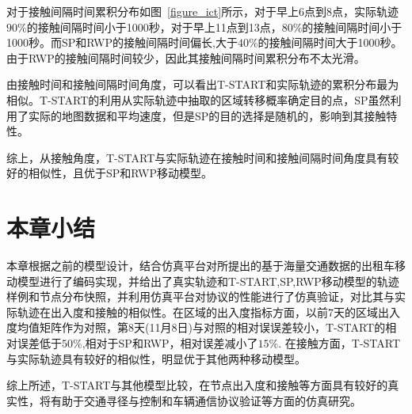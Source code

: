 对于接触间隔时间累积分布如图~\ref{figure_ict}所示，对于早上6点到8点，实际轨迹$90\%$的接触间隔时间小于1000秒，对于早上11点到13点，$80\%$的接触间隔时间小于1000秒。而SP和RWP的接触间隔时间偏长,大于$40\%$的接触间隔时间大于1000秒。由于RWP的接触间隔时间较少，因此其接触间隔时间累积分布不太光滑。

由接触时间和接触间隔时间角度，可以看出T-START和实际轨迹的累积分布最为相似。T-START的利用从实际轨迹中抽取的区域转移概率确定目的点，SP虽然利用了实际的地图数据和平均速度，但是SP的目的选择是随机的，影响到其接触特性。

综上，从接触角度，T-START与实际轨迹在接触时间和接触间隔时间角度具有较好的相似性，且优于SP和RWP移动模型。
\section{本章小结}

本章根据之前的模型设计，结合仿真平台对所提出的基于海量交通数据的出租车移动模型进行了编码实现，并给出了真实轨迹和T-START,SP,RWP移动模型的轨迹样例和节点分布快照，并利用仿真平台对协议的性能进行了仿真验证，对比其与实际轨迹在出入度和接触的相似性。在区域的出入度指标方面，以前7天的区域出入度均值矩阵作为对照，第8天(11月8日)与对照的相对误误差较小，T-START的相对误差低于$50\%$,相对于SP和RWP，相对误差减小了$15\%$.
在接触方面，T-START与实际轨迹具有较好的相似性，明显优于其他两种移动模型。

综上所述，T-START与其他模型比较，在节点出入度和接触等方面具有较好的真实性，将有助于交通寻径与控制和车辆通信协议验证等方面的仿真研究。

